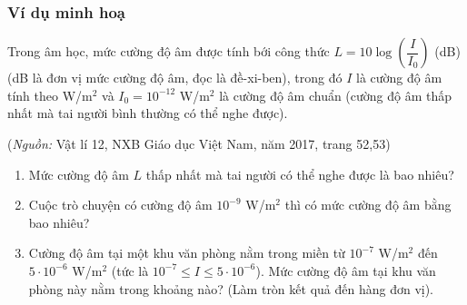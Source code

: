 \subsubsection{Ví dụ minh hoạ}
\begin{vd}%
	Trong âm học, mức cường độ âm được tính bới công thức $L=10\log\left(\dfrac{I}{I_0}\right)$ (dB) (dB là đơn vị mức cường độ âm, đọc là đề-xi-ben), trong đó $I$ là cường độ âm tính theo W/m$^2$ và $I_0=10^{-12}$ W/m$^2$ là cường độ âm chuẩn (cường độ âm thấp nhất mà tai người bình thường có thể nghe được).
	\begin{center}
		(\textit{Nguồn:} Vật lí 12, NXB Giáo dục Việt Nam, năm 2017, trang 52,53)
	\end{center}
	\begin{enumerate}
		\item Mức cường độ âm $L$ thấp nhất mà tai người có thể nghe được là bao nhiêu?
		\item Cuộc trò chuyện có cường độ âm $10^{-9}$ W/m$^2$ thì có mức cường độ âm bằng bao nhiêu?
		\item Cường độ âm tại một khu văn phòng nằm trong miền từ $10^{-7}$ W/m$^2$ đến $5\cdot10^{-6}$ W/m$^2$ (tức là $10^{-7}\le I\le5\cdot10^{-6}$). Mức cường độ âm tại khu văn phòng này nằm trong khoảng nào? (Làm tròn kết quả đến hàng đơn vị).
	\end{enumerate}
\end{vd}
